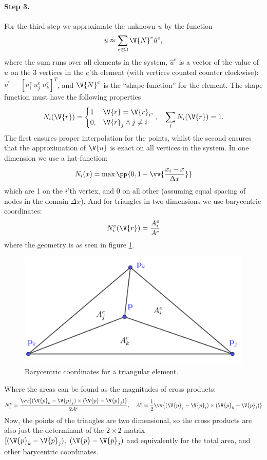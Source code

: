 \documentclass[sigconf]{acmart}
\begin{document}
\paragraph{Step 3.} For the third step we approximate the unknown $ u $ by the function
\begin{equation}\label{key}
	u \approx \sum_{e\in \Omega} \V{N}^e \hat{u}^e,
\end{equation}
where the sum runs over all elements in the system, $ \hat{u}^e $ is a vector of the value of $ u $ on the 3 vertices in the $ e $'th element (with vertices counted counter clockwise): $ \hat{u}^e  = [u_i^e \ u^e_j \ u^e_k]^T $, and $ \V{N}^e $ is the ``shape function'' for the element. The shape function must have the following properties
\begin{equation}\label{key}
	N_i(\V{r}) = \begin{cases}
	1 & \V{r} = \V{r}_i, \\ 0, & \V{r}_j \land j \neq i
	\end{cases}, \quad \sum_{i} N_i(\V{r}) = 1.
\end{equation}
The first ensures proper interpolation for the points, whilst the second ensures that the approximation of $ \V{u} $ is exact on all vertices in the system. In one dimension we use a hat-function:
\begin{equation}\label{key}
	N_i(x) = \max\pp{0, 1- \vv{\frac{x_i - x}{\Delta x}}}
\end{equation}
which are 1 on the $ i $'th vertex, and 0 on all other (assuming equal spacing of nodes in the domain $ \Delta x $). And for triangles in two dimensions we use barycentric coordinates:
\begin{equation}\label{key}
	N_i^e(\V{r}) = \frac{A_i^e}{A^e}
\end{equation}
where the geometry is as seen in figure \ref{fig:barycentric}.
\begin{figure}
	\centering
	\includegraphics[width=0.7\linewidth]{barycentric.png}
	\caption{Barycentric coordinates for a triangular element.}
	\label{fig:barycentric}
\end{figure}
Where the areas can be found as the magnitudes of cross products:
\begin{equation}\label{key}
	N_i^e = \frac{\vv{(\V{p}_k - \V{p}_j) \times (\V{p}-\V{p}_j)}}{2 A^e}, \quad A^e = \frac{1}{2} \vv{(\V{p}_j - \V{p}_i) \times (\V{p}_k - \V{p}_i)}
\end{equation}
Now, the points of the triangles are two dimensional, so the cross products are also just the determinant of the $ 2 \times 2 $ matrix $ [(\V{p}_k - \V{p}_j),  \ (\V{p}-\V{p}_j) $ and equivalently for the total area, and other barycentric coordinates.
\end{document}
